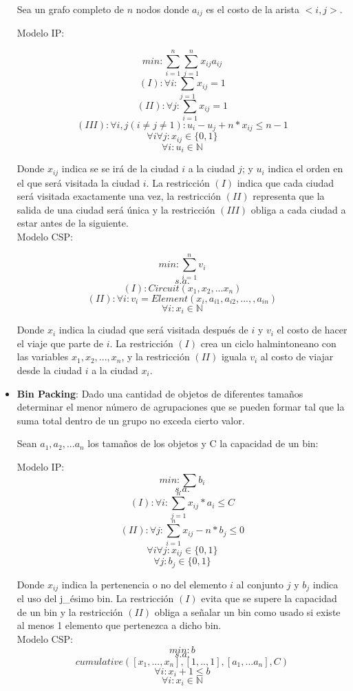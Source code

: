 \documentclass[12pt]{report}
\begin{document}
\begin{itemize}
Sea un grafo completo de $n$ nodos donde $a_{ij}$ es el costo de la arista $<i,j>$.

Modelo IP:

$$min: \sum_{i=1}^n\sum_{j=1}^n x_{ij}a_{ij}$$
$$(I):\forall i: \sum_{j=1}x_{ij}=1$$
$$(II):\forall j: \sum_{i=1}x_{ij}=1$$
$$(III):\forall i,j (i\neq j\neq1):u_i-u_j+n*x_{ij}\leq n-1$$
$$\forall i\forall j: x_{ij}\in\{0,1\}$$
$$\forall i: u_i\in \mathbb{N}$$

Donde $x_{ij}$ indica se se irá de la ciudad $i$ a la ciudad $j$; y $u_i$ indica el orden en el que será visitada la ciudad $i$. La restricción $(I)$ indica que cada ciudad será visitada exactamente una vez, la restricción $(II)$ representa que la salida de una ciudad será única y la restricción $(III)$ obliga a cada ciudad a estar antes de la siguiente.\\

Modelo CSP:

$$min:\sum_{i=1}^n v_i$$
$$s.a.$$
$$(I):Circuit(x_1,x_2,...x_n)$$
$$(II):\forall i:v_i=Element(x_i,a_{i1},a_{i2},...,,a_{in})$$
$$\forall i: x_i\in \mathbb{N}$$

Donde $x_i$ indica la ciudad que será visitada después de $i$ y $v_i$ el costo de hacer el viaje que parte de $i$. La restricción $(I)$ crea un ciclo halmintoneano con las variables $x_1,x_2,...,x_n$, y la restricción $(II)$ iguala $v_i$ al costo de viajar desde la ciudad $i$ a la ciudad $x_i$.

\item \textbf{Bin Packing}: Dado una cantidad de objetos de diferentes tamaños determinar el menor número de agrupaciones que se pueden formar tal que la suma total dentro de un grupo no exceda cierto valor.

Sean $a_1, a_2,...a_n$ los tamaños de los objetos y C la capacidad de un bin:

Modelo IP:
$$min:\sum b_i$$
$$s.a.$$
$$(I): \forall i: \sum_{j=1}^n x_{ij}*a_i\leq C$$
$$(II):\forall j:\sum_{i=1}^n x_{ij} -n*b_j\leq0$$
$$\forall i\forall j: x_{ij}\in\{0,1\}$$
$$\forall j: b_j\in \{0,1\}$$

Donde $x_{ij}$ indica la pertenencia o no del elemento $i$ al conjunto $j$ y $b_j$ indica el uso del j\_ésimo bin. La restricción $(I)$ evita que se supere la capacidad de un bin y la restricción $(II)$ obliga a señalar un bin como usado si existe al menos 1 elemento que pertenezca a dicho bin.\\

Modelo CSP:
$$min: b$$
$$s.a.$$
$$cumulative([x_1,...,x_n],[1,..,1],[a_1,...a_n],C)$$
$$\forall i: x_i+1\leq b$$
$$\forall i: x_i\in \mathbb{N}$$


\end{itemize}
\end{document}
